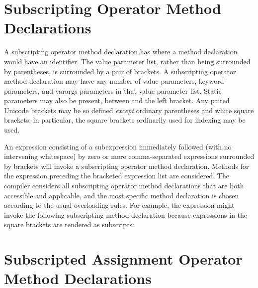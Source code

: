 %
%
%
%

\section{Subscripting Operator Method Declarations}

A subscripting operator method declaration has
 where a method declaration would have an identifier.
The value parameter list, rather than being surrounded by parentheses,
is surrounded by a pair of brackets.  A subscripting operator method
declaration may have any number of value parameters, keyword parameters,
and varargs  parameters in that
value parameter list.  Static parameters may also be present, between
 and the left bracket.  Any paired
Unicode brackets may be so defined \emph{except} ordinary
parentheses and white square brackets; in particular, the square
brackets ordinarily used for indexing may be used.

An expression consisting of a subexpression immediately
followed (with no intervening whitespace) by zero or more
comma-separated expressions surrounded by brackets will
invoke a subscripting operator method declaration.  Methods
for the expression preceding the bracketed expression list are
considered.  The compiler considers all subscripting operator method
declarations that are both accessible and applicable, and the most
specific method declaration is chosen according to the usual overloading
rules.  For example, the expression  might invoke the
following subscripting method declaration because expressions in the square
brackets are rendered as subscripts:




\section{Subscripted Assignment Operator Method Declarations}

